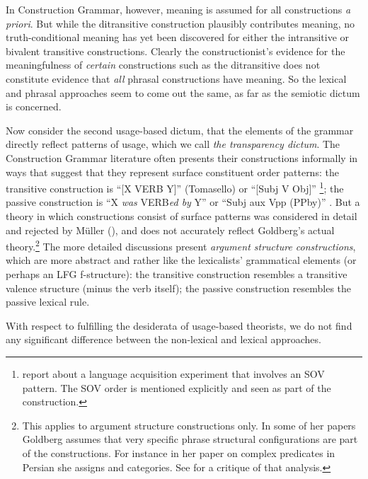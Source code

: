 In Construction Grammar, however, meaning is assumed for all constructions  \emph{a priori}.  But
while the ditransitive construction plausibly contributes meaning, no truth-conditional meaning has
yet been discovered for either the intransitive or bivalent transitive constructions.  Clearly the
constructionist's evidence for the meaningfulness of \emph{certain} constructions such as the
ditransitive does not constitute evidence that \emph{all} phrasal constructions have meaning.  So
the lexical and phrasal approaches seem to come out the same, as far as the semiotic dictum is
concerned.


Now consider the second usage-based dictum, that the elements of the grammar directly reflect
patterns of usage, which we call \emph{the transparency dictum}.  The Construction Grammar
literature often presents their constructions informally in ways that suggest that they represent
surface constituent order patterns: the transitive construction is ``[X VERB Y]'' (Tomasello) or ``[Subj V Obj]''
\citep{Goldberg95a,Goldberg2006a}\footnote{%
  \citet[]{GCS2004a} report about a language acquisition experiment that involves an SOV
  pattern. The SOV order is mentioned explicitly and seen as part of the construction.
}; the passive construction is ``X \emph{was} VERB\emph{ed by} Y''
\citep[]{Tomasello2003a} or ``Subj aux Vpp (PPby)'' \citep[]{Goldberg2006a}.  But a theory
in which constructions consist of surface patterns was considered in detail and rejected by
Müller (\citeyear[Section~2]{Mueller2006d}), and does not accurately reflect Goldberg's actual
theory.\footnote{%
  This applies to argument structure constructions only. In some of her papers Goldberg assumes that
  very specific phrase structural configurations are part of the constructions. For instance in her
  paper on complex predicates in Persian \citep{Goldberg2003a} she assigns \vnull and \vbar categories. See
   for a critique of that analysis.} 
The more detailed discussions present \emph{argument structure
  constructions}, which are more abstract and rather like the lexicalists' grammatical elements (or
perhaps an LFG f-structure): the transitive construction resembles a transitive valence structure
(minus the verb itself); the passive construction resembles the passive lexical rule.

With respect to fulfilling the desiderata of usage-based theorists, we do not find 
any significant difference between the
non-lexical and lexical approaches.  

